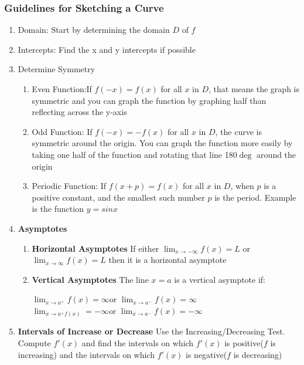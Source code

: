 \documentclass[10pt,a4paper]{article}
\begin{document}
	\subsubsection{Guidelines for Sketching a Curve}
		\begin{enumerate}
			\item Domain: Start by determining the domain $D$ of $f$
			\item Intercepts: Find the x and y intercepts if possible
			\item Determine Symmetry
				\begin{enumerate}
					\item Even Function:If $f(-x) = f(x)$ for all $x$ in $D$, that means the graph is symmetric and you can graph the function by graphing half than reflecting across the y-axis
					\item Odd Function: If $f(-x) = -f(x)$ for all $x$ in $D$, the curve is symmetric around the origin. You can graph the function more easily by taking one half of the function and rotating that line 180$\deg$ around the origin
					\item Periodic Function: If $f(x+p) = f(x)$ for all $x$ in $D$, when $p$ is a positive constant, and the smallest such number $p$ is the period. Example is the function $y=sin{x}$
				\end{enumerate}
			\item \textbf{Asymptotes}
				\begin{enumerate}
					\item \textbf{Horizontal Asymptotes} \quad If either $\lim_{x \rightarrow -\infty}{f(x)}=L$ or \linebreak $\lim_{x \rightarrow \infty}{f(x)} = L$ then it is a horizontal asymptote
					
					\item \textbf{Vertical Asymptotes} \quad  The line $x=a$ is a vertical asymptote if:
						\begin{center}
							$\lim_{x \rightarrow a^{+}}{f(x)} = \infty$\quad or \quad $\lim_{x \rightarrow a^{-}}{f(x)}=\infty $
\\							$\lim_{x \rightarrow a^{+}{f(x)}} = -\infty $\quad or \quad $\lim_{x \rightarrow a^{-}}{f(x)}= - \infty $
						\end{center}
				\end{enumerate}
			\item \textbf{Intervals of Increase or Decrease} Use the Increasing/Decreasing Test. Compute $f'(x)$ and find the intervals on which $f'(x)$ is positive($f$ is increasing) and the intervals on which $f'(x)$ is negative($f$ is decreasing)
			

\end{enumerate}
\end{document}
